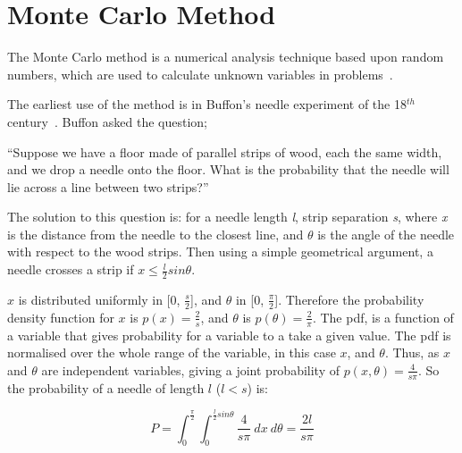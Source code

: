 
\section{Monte Carlo Method}\label{sec:mcmethod}
The Monte Carlo method is a numerical analysis technique based upon random numbers, which are used to calculate unknown variables in problems~\cite{cashwell1959practical,rogers1990monte}. 

The earliest use of the method is in Buffon's needle experiment of the 18$^{th}$ century~\cite{badger1994lazzarini,beckmann2015history,buffon1785histoire}. Buffon asked the question;

\medskip

``Suppose we have a floor made of parallel strips of wood, each the same width, and we drop a needle onto the floor. What is the probability that the needle will lie across a line between two strips?''

\medskip

The solution to this question is:
for a needle length \textit{l}, strip separation \textit{s}, where \textit{x} is the distance from the needle to the closest line, and $\theta$ is the angle of the needle with respect to the wood strips. Then using a simple geometrical argument, a needle crosses a strip if $x \leq \tfrac{l}{2} sin \theta$.

$x$ is distributed uniformly in [0, $\tfrac{s}{2}$], and $\theta$ in [0, $\tfrac{\pi}{2}$]. Therefore the probability density function for $x$ is $p(x)=\tfrac{2}{s}$, and $\theta$ is $p(\theta) = \tfrac{2}{\pi}$. The \gls*{pdf}, is a function of a variable that gives probability for a variable to a take a given value. The \gls*{pdf} is normalised over the whole range of the variable, in this case $x$, and $\theta$.
Thus, as $x$ and $\theta$ are independent variables, giving a joint probability of $p(x,\theta) = \tfrac{4}{s \pi}$.
So the probability of a needle of length $l$ ($l<s$) is:

\begin{equation}
P=\int_0^{\frac{\pi}{2}}\int_0^{\frac{l}{2}sin\theta}\frac{4}{s\pi}\ dx\ d\theta = \frac{2 l}{s \pi}\label{eqn:buffon}
\end{equation}



